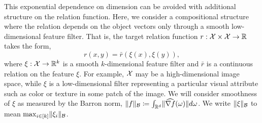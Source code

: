 This exponential dependence on dimension can be avoided with additional structure on the relation function. Here, we consider a compositional structure where the relation depends on the object vectors only through a smooth low-dimensional feature filter. That is, the target relation function $r: {\mathcal{X}} \times {\mathcal{X}} \to \mathbb{R}$ takes the form,
\begin{equation*}
    r(x, y) = \bar{r}(\xi(x), \xi(y)),
\end{equation*}
where $\xi : {\mathcal{X}} \to \mathbb{R}^k$ is a smooth $k$-dimensional feature filter and $\bar{r}$ is a continuous relation on the feature $\xi$. For example, ${\mathcal{X}}$ may be a high-dimensional image space, while $\xi$ is a low-dimensional filter representing a particular visual attribute such as color or texture in some patch of the image. We will consider smoothness of $\xi$ as measured by the Barron norm, $\lVert f\rVert_{{\mathcal{B}}} \coloneq \int_{\mathbb{R}^d} \lVert\widehat{\nabla f}(\omega)\rVert d\omega$. We write $\lVert\xi\rVert_{{\mathcal{B}}}$ to mean $\max_{i \in [k]} \lVert\xi_i\rVert_{{\mathcal{B}}}$.

